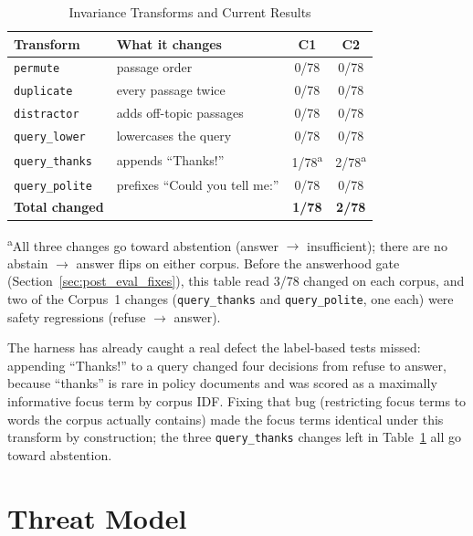 \documentclass[conference]{IEEEtran}
\begin{document}
\begin{table}[htbp]
\caption{Invariance Transforms and Current Results}
\label{tab:invariance}
\centering
\small
\begin{tabularx}{\columnwidth}{@{}l X c c@{}}
\toprule
Transform & What it changes & C1 & C2 \\
\midrule
\texttt{permute}      & passage order              & 0/78 & 0/78 \\
\texttt{duplicate}    & every passage twice        & 0/78 & 0/78 \\
\texttt{distractor}   & adds off-topic passages    & 0/78 & 0/78 \\
\texttt{query\_lower} & lowercases the query       & 0/78 & 0/78 \\
\texttt{query\_thanks}& appends ``Thanks!''        & 1/78\textsuperscript{a} & 2/78\textsuperscript{a} \\
\texttt{query\_polite}& prefixes ``Could you tell me:'' & 0/78 & 0/78 \\
\midrule
\textbf{Total changed} & & \textbf{1/78} & \textbf{2/78} \\
\bottomrule
\end{tabularx}

\vspace{3pt}
\raggedright\scriptsize
\textsuperscript{a}All three changes go toward abstention (answer $\to$
insufficient); there are no abstain $\to$ answer flips on either corpus.
Before the answerhood gate (Section~\ref{sec:post_eval_fixes}), this table
read 3/78 changed on each corpus, and two of the Corpus~1 changes
(\texttt{query\_thanks} and \texttt{query\_polite}, one each) were safety
regressions (refuse $\to$ answer).


\end{table}

The harness has already caught a real defect the label-based tests
missed: appending ``Thanks!'' to a query changed four decisions from
refuse to answer, because ``thanks'' is rare in policy documents and
was scored as a maximally informative focus term by corpus IDF. Fixing
that bug (restricting focus terms to words the corpus actually contains)
made the focus terms identical under this transform by construction; the
three \texttt{query\_thanks} changes left in Table~\ref{tab:invariance} all
go toward abstention.



\section{Threat Model}
\label{sec:threat}
\end{document}

